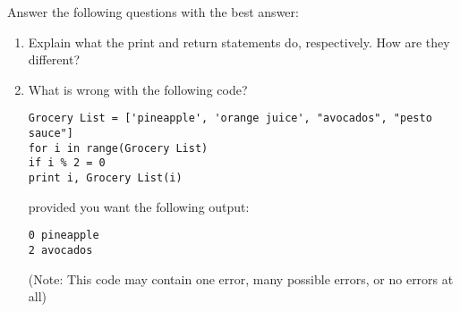 \begin{problem}
Answer the following questions with the best answer:
\begin{enumerate}
\item Explain what the print and return statements do, respectively. How are they different?
\item What is wrong with the following code?
\begin{lstlisting}
Grocery List = ['pineapple', 'orange juice', "avocados", "pesto sauce"]
for i in range(Grocery List)
if i % 2 = 0
print i, Grocery List(i)
\end{lstlisting}
provided you want the following output:
\begin{lstlisting}
0 pineapple
2 avocados
\end{lstlisting}
(Note: This code may contain one error, many possible errors, or no errors at all)
\end{enumerate}
\end{problem}


